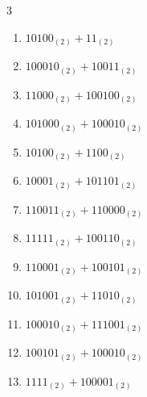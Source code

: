 \begin{multicols}{3}
\begin{enumerate}

  \item $10100_{(2)} + 11_{(2)}$


  \item $100010_{(2)} + 10011_{(2)}$


  \item $11000_{(2)} + 100100_{(2)}$


  \item $101000_{(2)} + 100010_{(2)}$


  \item $10100_{(2)} + 1100_{(2)}$


  \item $10001_{(2)} + 101101_{(2)}$


  \item $110011_{(2)} + 110000_{(2)}$


\columnbreak %

  \item $11111_{(2)} + 100110_{(2)}$


  \item $110001_{(2)} + 100101_{(2)}$


  \item $101001_{(2)} + 11010_{(2)}$


  \item $100010_{(2)} + 111001_{(2)}$


  \item $100101_{(2)} + 100010_{(2)}$


  \item $1111_{(2)} + 100001_{(2)}$



\end{enumerate}
\end{multicols}
